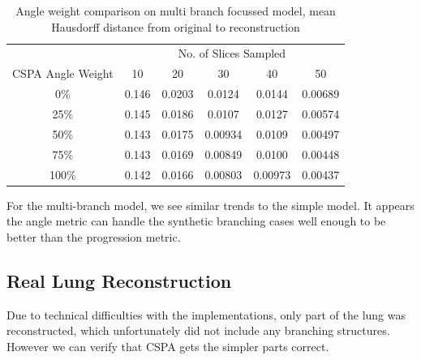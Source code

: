 \documentclass[11p, titlepage]{article}
\begin{document}
\begin{table}[h!]
\begin{tabular}{ | c | c | c | c | c | c | }
\hline
& \multicolumn{5}{c|}{No. of Slices Sampled} \\
\cline{2-6}
CSPA Angle Weight & 10 & 20 & 30 & 40 & 50 \\
\hline
0\% & 0.146 & 0.0203 & 0.0124 & 0.0144 & 0.00689 \\
25\% & 0.145 & 0.0186 & 0.0107 & 0.0127 & 0.00574 \\
50\% & 0.143 & 0.0175 & 0.00934 & 0.0109 & 0.00497 \\
75\% & 0.143 & 0.0169 & 0.00849 & 0.0100 & 0.00448 \\
100\% & 0.142 & 0.0166 & 0.00803 & 0.00973 & 0.00437 \\
\hline
\end{tabular}
\caption{Angle weight comparison on multi branch focussed model, mean Hausdorff distance from original to reconstruction}
\label{table:ang_weight_multi_branch_focussed_forward}
\end{table}

For the multi-branch model, we see similar trends to the simple model. It appears the angle metric can handle the synthetic branching cases well enough to be better than the progression metric.
\pagebreak

\subsection{Real Lung Reconstruction}

Due to technical difficulties with the implementations, only part of the lung was reconstructed, which unfortunately did not include any branching structures. However we can verify that CSPA gets the simpler parts correct.
\end{document}
